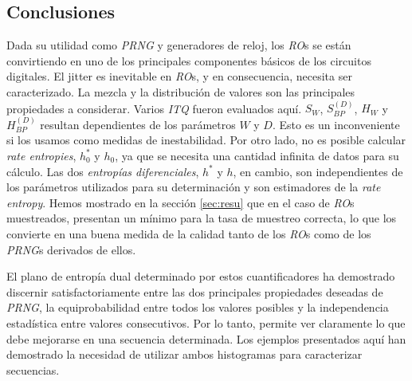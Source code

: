 \subsection{Conclusiones}

Dada su utilidad como \emph{PRNG} y generadores de reloj, los \emph{RO}s se están convirtiendo en uno de los principales componentes básicos de los circuitos digitales.
El jitter es inevitable en \emph{RO}s, y en consecuencia, necesita ser caracterizado.
La mezcla y la distribución de valores son las principales propiedades a considerar.
Varios \emph{ITQ} fueron evaluados aquí.
$S_W$, $S^{(D)}_{BP}$, $H_W$ y $H^{(D)}_{BP}$ resultan dependientes de los parámetros $W$ y $D$.
Esto es un inconveniente si los usamos como medidas de inestabilidad.
Por otro lado, no es posible calcular \emph{rate entropies}, $h_0^*$ y $h_0$, ya que se necesita una cantidad infinita de datos para su cálculo.
Las dos \emph{entropías diferenciales}, $h^*$ y $h$, en cambio, son independientes de los parámetros utilizados para su determinación y son estimadores de la \emph{rate entropy}.
Hemos mostrado en la sección \ref{sec:resu} que en el caso de \emph{RO}s muestreados, presentan un mínimo para la tasa de muestreo correcta, lo que los convierte en una buena medida de la calidad tanto de los \emph{RO}s como de los \emph{PRNG}s derivados de ellos.

El plano de entropía dual determinado por estos cuantificadores ha demostrado discernir satisfactoriamente entre las dos principales propiedades deseadas de \emph{PRNG}, la equiprobabilidad entre todos los valores posibles y la independencia estadística entre valores consecutivos.
Por lo tanto, permite ver claramente lo que debe mejorarse en una secuencia determinada.
Los ejemplos presentados aquí han demostrado la necesidad de utilizar ambos histogramas para caracterizar secuencias.